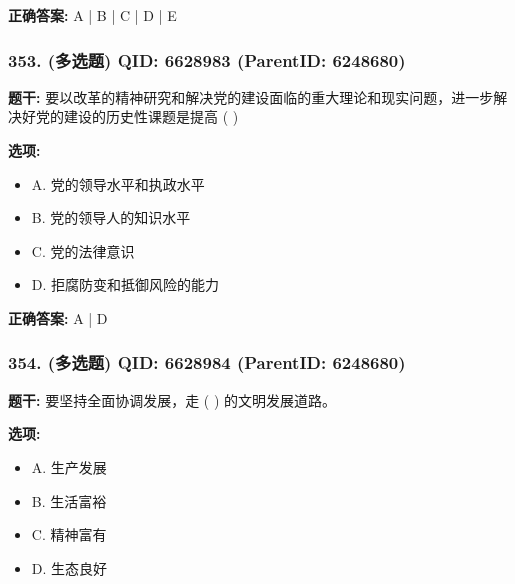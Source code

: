 \documentclass[12pt,UTF8]{ctexart}
\begin{document}
\textbf{正确答案:}
A | B | C | D | E

\vspace{0.3em}\hrulefill\vspace{0.7em}

\subsubsection*{353. (多选题) \small QID: 6628983 (ParentID: 6248680)}

\textbf{题干:}
要以改革的精神研究和解决党的建设面临的重大理论和现实问题，进一步解决好党的建设的历史性课题是提高  ( )



\textbf{选项:}
\begin{itemize}[leftmargin=*]

  \item A. 党的领导水平和执政水平

  \item B. 党的领导人的知识水平

  \item C. 党的法律意识

  \item D. 拒腐防变和抵御风险的能力

\end{itemize}

\textbf{正确答案:}
A | D

\vspace{0.3em}\hrulefill\vspace{0.7em}

\subsubsection*{354. (多选题) \small QID: 6628984 (ParentID: 6248680)}

\textbf{题干:}
要坚持全面协调发展，走  ( )  的文明发展道路。



\textbf{选项:}
\begin{itemize}[leftmargin=*]

  \item A. 生产发展

  \item B. 生活富裕

  \item C. 精神富有

  \item D. 生态良好

\end{itemize}
\end{document}
